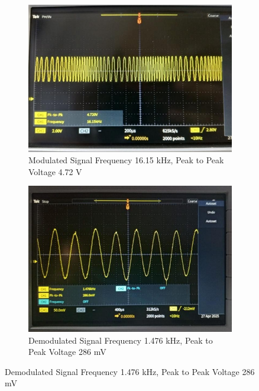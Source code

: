 \documentclass[a4paper,12pt]{article}
\begin{document}
\begin{figure}[H]
\begin{subfigure}[t]{0.49\textwidth}
		\centering
		\includegraphics[width=1\linewidth]{Images/11}
		\caption{Modulated Signal Frequency 16.15 kHz,                        
			Peak to Peak Voltage 4.72 V 
		}
	\end{subfigure}
	\hfil
	\begin{subfigure}[t]{0.49\textwidth}
		\centering
		\includegraphics[width=1\linewidth]{Images/12}
		\caption{ Demodulated Signal Frequency 1.476 kHz,               
		                                  Peak to Peak Voltage 286 mV
		}
	\end{subfigure}
\end{figure}
\end{document}
